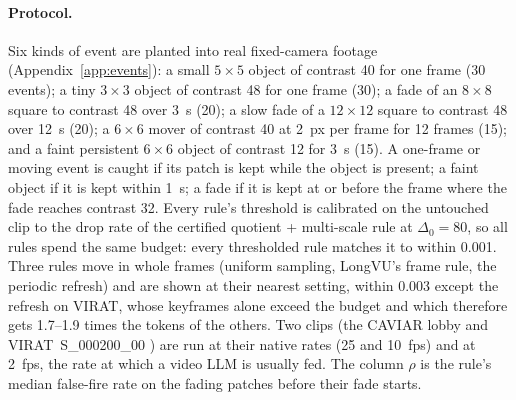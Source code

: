 \paragraph{Protocol.} Six kinds of event are planted into real fixed-camera footage (Appendix~\ref{app:events}): a small $5{\times}5$ object of contrast 40 for one frame (30 events); a tiny $3{\times}3$ object of contrast 48 for one frame (30); a fade of an $8{\times}8$ square to contrast 48 over 3~s (20); a slow fade of a $12{\times}12$ square to contrast 48 over 12~s (20); a $6{\times}6$ mover of contrast 40 at 2~px per frame for 12 frames (15); and a faint persistent $6{\times}6$ object of contrast 12 for 3~s (15). A one-frame or moving event is caught if its patch is kept while the object is present; a faint object if it is kept within 1~s; a fade if it is kept at or before the frame where the fade reaches contrast 32. Every rule's threshold is calibrated on the untouched clip to the drop rate of the certified quotient + multi-scale rule at $\Delta_0 = 80$, so all rules spend the same budget: every thresholded rule matches it to within 0.001. Three rules move in whole frames (uniform sampling, LongVU's frame rule, the periodic refresh) and are shown at their nearest setting, within 0.003 except the refresh on VIRAT, whose keyframes alone exceed the budget and which therefore gets 1.7--1.9 times the tokens of the others. Two clips (the CAVIAR lobby \citep{caviar2004} and VIRAT~S\_000200\_00 \citep{oh2011virat}) are run at their native rates (25 and 10~fps) and at 2~fps, the rate at which a video LLM is usually fed. The column $\rho$ is the rule's median false-fire rate on the fading patches before their fade starts.

\begin{table}[t]
\centering\scriptsize
\setlength{\tabcolsep}{3.5pt}
\resizebox{\linewidth}{!}{}

\vspace{4pt}
\resizebox{\linewidth}{!}{}
\caption{Recall of planted events at a matched budget, CAVIAR lobby at 25~fps (top) and VIRAT at 10~fps (bottom). Every rule is calibrated to the drop rate of certified quotient + multi-scale at $\Delta_0 = 80$ (to within 0.001; whole-frame rules at their nearest setting). ``Cannot reach the budget'' means no threshold of the rule drops that share of patches; PruneVid's segment rule tops out near 0.94. The 2~fps runs are in Table~\ref{tab:audit2fps}.}
\label{tab:audit}
\end{table}

